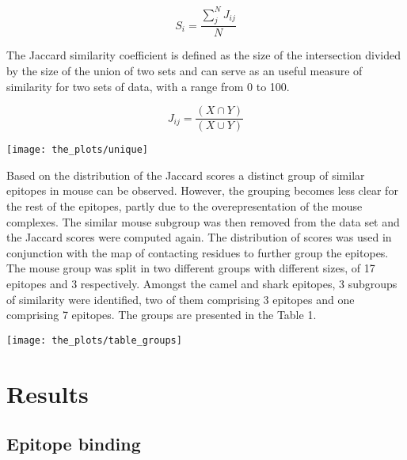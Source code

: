 \documentclass{article}
\begin{document}
\begin{equation}
S_i = \frac{\sum\limits_{j}^{N}J_{ij}}{N}
\end{equation}



The Jaccard similarity coefficient is defined as the size of the intersection divided by the size of the union of two sets and can serve as an useful measure of similarity for  two sets of data, with a range from 0 to 100. 

$$J_{ij} = \frac{(X \cap Y )}{(X \cup Y)}$$




\begin{center}
	
	\texttt{[image: the\_plots/unique]}
	 \label{pix:jaccdistr} %
\end{center}
\bigbreak


Based on the distribution of the Jaccard scores a distinct group of similar epitopes in mouse can be observed. However, the grouping becomes less clear for the rest of the epitopes, partly due to the overepresentation of  the mouse complexes. The similar mouse subgroup was then removed from the data set and the Jaccard scores were computed again. The distribution of scores was used in conjunction with the map of contacting residues to further group the epitopes. The mouse group was split in two different groups with different sizes, of 17 epitopes and 3 respectively. Amongst the camel and shark epitopes, 3 subgroups of similarity were identified, two of them comprising 3 epitopes and one comprising 7 epitopes. The groups are presented in the Table 1.
\begin{center}
	
	\texttt{[image: the\_plots/table\_groups]}
	 \label{pix:jaccdistr} %
\end{center}
\bigbreak

\section{Results}
\subsection{Epitope binding}
\end{document}
